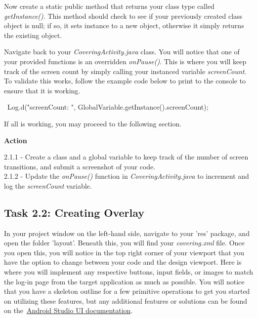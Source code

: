 \documentclass[letterpaper,12pt]{report}
\begin{document}
\bigskip

Now create a static public method that returns your class type called \\\emph{getInstance()}. This method should check to see if your previously created class object is null; if so, it sets instance to a new object, otherwise it simply returns the existing object.

\bigskip

Navigate back to your \emph{CoveringActivity.java} class. You will notice that one of your provided functions is an overridden \emph{onPause()}. This is where you will keep track of the screen count by simply calling your instanced variable \emph{screenCount}. To validate this works, follow the example code below to print to the console to ensure that it is working.

\bigskip
\begin{mdframed}[backgroundcolor=black!10,style=code,nobreak=true,align=center,userdefinedwidth=14cm]
\ Log.d("screenCount: ", GlobalVariable.getInstance().screenCount);
\end{mdframed}
\bigskip

If all is working, you may proceed to the following section.

\bigskip
\begin{mdframed}[backgroundcolor=blue!10,style=code,nobreak=true,align=center,userdefinedwidth=14cm]
\textbf{Action}
\bigskip

2.1.1 - Create a class and a global variable to keep track of the number of screen transitions, and submit a screenshot of your code.\\
2.1.2 - Update the \textit{onPause()} function in \textit{CoveringActivity.java} to increment and log the \textit{screenCount} variable.\\
\end{mdframed}

\subsection*{Task 2.2: Creating Overlay}\label{sec:Task-2.2-Creating-Overlay}

In your project window on the left-hand side, navigate to your 'res' package, and open the folder 'layout'. Beneath this, you will find your \emph{covering.xml} file. Once you open this, you will notice in the top right corner of your viewport that you have the option to change between your code and the design viewport. Here is where you will implement any respective buttons, input fields, or images to match the log-in page from the target application as much as possible. You will notice that you have a skeleton outline for a few primitive operations to get you started on utilizing these features, but any additional features or solutions can be found on the~\href{https://developer.android.com/develop/ui}{Android Studio UI documentation}.
\end{document}
